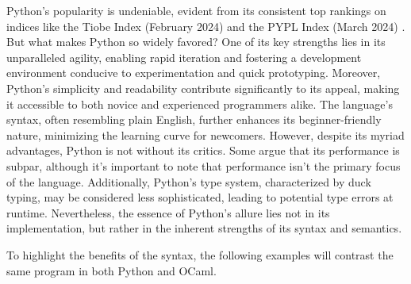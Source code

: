 \documentclass{l4proj}
\begin{document}


Python's popularity is undeniable, evident from its consistent top rankings on indices like the Tiobe Index (February 2024)\citep{TIOBE} and the PYPL Index (March 2024) .
But what makes Python so widely favored? One of its key strengths lies in its unparalleled agility, enabling rapid iteration and fostering a development environment conducive to experimentation and quick prototyping.
Moreover, Python's simplicity and readability contribute significantly to its appeal, making it accessible to both novice and experienced programmers alike.
The language's syntax, often resembling plain English, further enhances its beginner-friendly nature, minimizing the learning curve for newcomers.
However, despite its myriad advantages, Python is not without its critics.
Some argue that its performance is subpar, although it's important to note that performance isn't the primary focus of the language.
Additionally, Python's type system, characterized by duck typing, may be considered less sophisticated, leading to potential type errors at runtime.
Nevertheless, the essence of Python's allure lies not in its implementation, but rather in the inherent strengths of its syntax and semantics.

To highlight the benefits of the syntax, the following examples will contrast the same program in both Python and OCaml.


\end{document}
